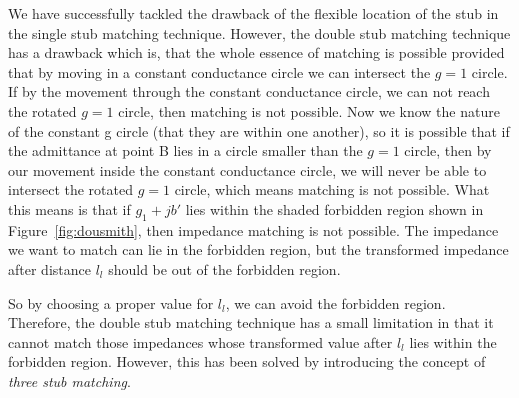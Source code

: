 We have successfully tackled the drawback of the flexible location of the stub in the single stub matching technique. However, the double stub matching technique has a drawback which is, that the whole essence of matching is possible provided that by moving in a constant conductance circle we can intersect the $g = 1$ circle. If by the movement through the constant conductance circle, we can not reach the rotated $g = 1$ circle, then matching is not possible. Now we know the nature of the constant g circle (that they are within one another), so it is possible that if the admittance at point B\textsuperscript{\textemdash} lies in a circle smaller than the $g = 1$ circle, then by our movement inside the constant conductance circle, we will never be able to intersect the rotated $g = 1$ circle, which means matching is not possible. What this means is that if $g_1 + jb'$ lies within the shaded forbidden region shown in Figure~\ref{fig:dousmith}, then impedance matching is not possible. The impedance we want to match can lie in the forbidden region, but the transformed impedance after distance $ l_l$ should be out of the forbidden region.

So by choosing a proper value for $l_l$, we can avoid the forbidden region. Therefore, the double stub matching technique has a small limitation in that it cannot match those impedances whose transformed value after $l_l$ lies within the forbidden region. However, this has been solved by introducing the concept of \emph{three stub matching}.

